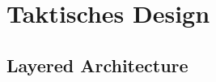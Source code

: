 \chapter{Taktisches Design}\label{chp:tactical}

\section{Layered Architecture}\label{chp:layeredArchitecture}